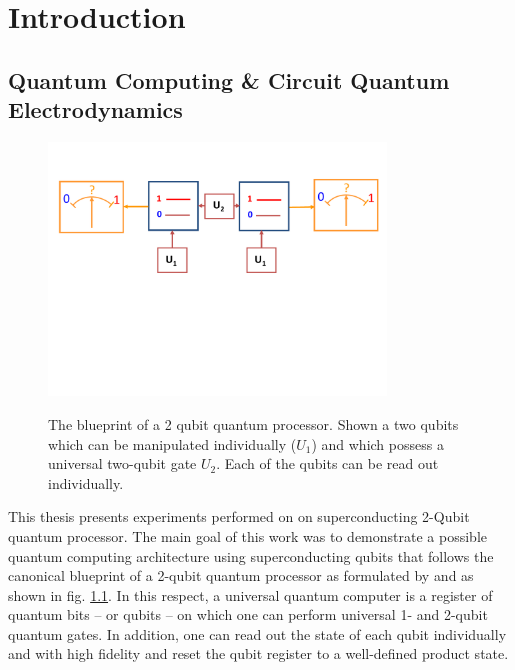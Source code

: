 \chapter{Introduction}


\section{Quantum Computing \& Circuit Quantum Electrodynamics}

\begin{figure}
	\centering
		\includegraphics[width=0.8\textwidth]{./material/papers/grover/submission1/Fig1}
	\label{fig:Grover1}
	\caption{The blueprint of a 2 qubit quantum processor. Shown a two qubits which can be manipulated individually ($U_1$) and which possess a universal two-qubit gate $U_2$. Each of the qubits can be read out individually.}
\end{figure}

This thesis presents experiments performed on on superconducting 2-Qubit quantum processor. The main goal of this work was to demonstrate a possible quantum computing architecture using superconducting qubits that follows the canonical blueprint of a 2-qubit quantum processor as formulated by \cite{divincenzo_physical_2000} and as shown in fig. \ref{fig:Grover1}. In this respect, a universal quantum computer is a register of quantum bits -- or qubits -- on which one can perform universal 1- and 2-qubit quantum gates. In addition, one can read out the state of each qubit individually and with high fidelity and reset the qubit register to a well-defined product state.

